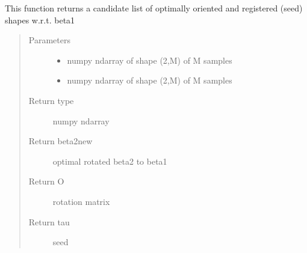 \documentclass[letterpaper,10pt,english]{sphinxmanual}
\begin{document}

\begin{fulllineitems}
\label{\detokenize{curve_functions:curve_functions.find_rotation_and_seed_coord}}
This function returns a candidate list of optimally oriented and
registered (seed) shapes w.r.t. beta1
\begin{quote}\begin{description}
\item[{Parameters}] \leavevmode\begin{itemize}
\item {} 
 \textendash{} numpy ndarray of shape (2,M) of M samples

\item {} 
 \textendash{} numpy ndarray of shape (2,M) of M samples

\end{itemize}

\item[{Return type}] \leavevmode
numpy ndarray

\item[{Return beta2new}] \leavevmode
optimal rotated beta2 to beta1

\item[{Return O}] \leavevmode
rotation matrix

\item[{Return tau}] \leavevmode
seed

\end{description}\end{quote}

\end{fulllineitems}

\end{document}
